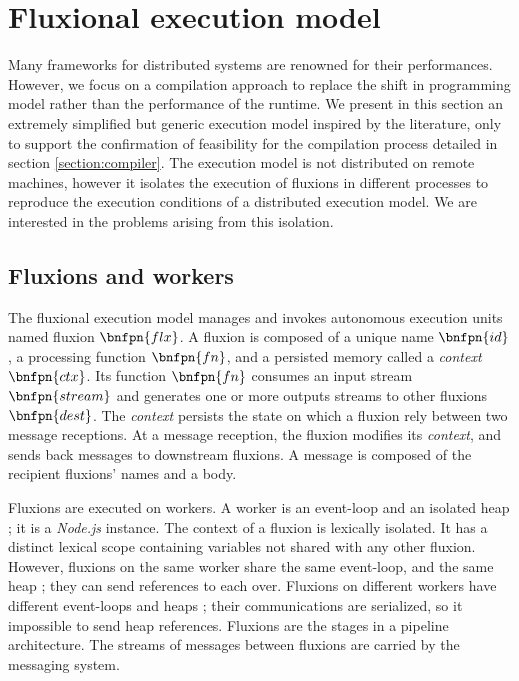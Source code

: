 \section{Fluxional execution model} \label{section:model}

Many frameworks for distributed systems are renowned for their performances\cite{Akidau2013, Jain2006, Marz2011, Welsh2000, Wu2007, Zaharia2010}.
However, we focus on a compilation approach to replace the shift in programming model rather than the performance of the runtime.
We present in this section an extremely simplified but generic execution model inspired by the literature, only to support the confirmation of feasibility for the compilation process detailed in section \ref{section:compiler}.
The execution model is not distributed on remote machines, however it isolates the execution of fluxions in different processes to reproduce the execution conditions of a distributed execution model.
We are interested in the problems arising from this isolation.

\subsection{Fluxions and workers}

The fluxional execution model manages and invokes autonomous execution units named fluxion $\bnfpn{flx}$.
A fluxion is composed of a unique name $\bnfpn{id}$, a processing function $\bnfpn{fn}$, and a persisted memory called a \textit{context} $\bnfpn{ctx}$.
Its function $\bnfpn{fn}$ consumes an input stream $\bnfpn{stream}$ and generates one or more outputs streams to other fluxions $\bnfpn{dest}$.
The \textit{context} persists the state on which a fluxion rely between two message receptions.
At a message reception, the fluxion modifies its \textit{context}, and sends back messages to downstream fluxions.
A message is composed of the recipient fluxions' names and a body.

Fluxions are executed on workers.
A worker is an event-loop and an isolated heap ; it is a \textit{Node.js} instance.
The context of a fluxion is lexically isolated.
It has a distinct lexical scope containing variables not shared with any other fluxion.
However, fluxions on the same worker share the same event-loop, and the same heap ; they can send references to each over.
Fluxions on different workers have different event-loops and heaps ; their communications are serialized, so it impossible to send heap references.
Fluxions are the stages in a pipeline architecture.
The streams of messages between fluxions are carried by the messaging system.

